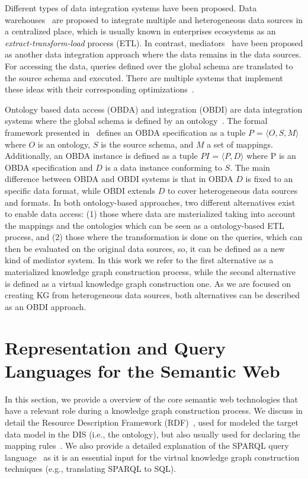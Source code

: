 Different types of data integration systems have been proposed. Data warehouses~\citep{vassiliadis2009survey} are proposed to integrate multiple and heterogeneous data sources in a centralized place, which is usually known in enterprises ecosystems as an \textit{extract-transform-load} process (ETL). In contrast, mediators~\citep{wiederhold1992mediators} have been proposed as another data integration approach where the data remains in the data sources. For accessing the data, queries defined over the global schema are translated to the source schema and executed. There are multiple systems that implement these ideas with their corresponding optimizations~\citep{tsimmis1994,rajaraman1996querying,roth1997don}.

Ontology based data access (OBDA) and integration (OBDI) are data integration systems where the global schema is defined by an ontology~\citep{poggi2008linking}. The formal framework presented in~\citep{xiao2018obdasurvey} defines an OBDA specification as a tuple $P$ = $\langle O,S,M\rangle$ where $O$ is an ontology, $S$ is the source schema, and $M$ a set of mappings. Additionally, an OBDA instance is defined as a tuple $PI$ = $\langle P,D\rangle$ where P is an OBDA specification and $D$ is a data instance conforming to $S$. The main difference between OBDA and OBDI systems is that in OBDA $D$ is fixed to an specific data format, while OBDI extends $D$ to cover heterogeneous data sources and formats. In both ontology-based approaches, two different alternatives exist to enable data access: (1) those where data are materialized taking into account the mappings and the ontologies which can be seen as a ontology-based ETL process, and (2) those where the transformation is done on the queries, which can then be evaluated on the original data sources, so, it can be defined as a new kind of mediator system. In this work we refer to the first alternative as a materialized knowledge graph construction process, while the second alternative is defined as a virtual knowledge graph construction one. As we are focused on creating KG from heterogeneous data sources, both alternatives can be described as an OBDI approach.

\section{Representation and Query Languages for the Semantic Web}
\label{sec:soa_representation}
In this section, we provide a overview of the core semantic web technologies that have a relevant role during a knowledge graph construction process. We discuss in detail the Resource Description Framework (RDF)~\citep{RDF}, used for modeled the target data model in the DIS (i.e., the ontology), but also usually used for declaring the mapping rules~\citep{R2RML,dimou2014rml,michel2015translation}. We also provide a detailed explanation of the SPARQL query language~\citep{SPARQL} as it is an essential input for the virtual knowledge graph construction techniques (e.g., translating SPARQL to SQL).

